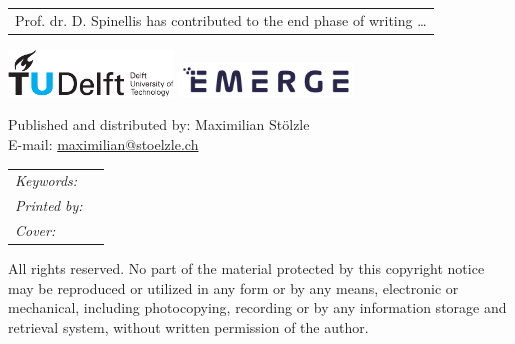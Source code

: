 \begin{titlepage}
\begin{tabular}{p{4.5cm}l}
    \multicolumn{2}{l}{Prof. dr. D. Spinellis has contributed to the end
    phase of writing \ldots} \\
\end{tabular}


\medskip
\medskip

\medskip
\vfill
\begin{center}
    \includegraphics[height=0.5in]{title/logos/tudelft}
    \hspace{2em}
    \includegraphics[height=0.35in]{title/logos/emerge}
\end{center}
\vfill

\noindent Published and distributed by: Maximilian Stölzle\\
E-mail: \href{mailto:maximilian@stoelzle.ch}{maximilian@stoelzle.ch}\\

\noindent
\begin{tabular}{@{}p{}@{}p{}}
  \textit{Keywords:} &  \\[\medskipamount]
      \textit{Printed by:} &  \\[\medskipamount]
      \textit{Cover:} &  \\[\medskipamount]
\end{tabular}

\medskip
\medskip
\noindent All rights reserved. No part of the material protected by this copyright notice may be
reproduced or utilized in any form or by any means, electronic or mechanical, including
photocopying, recording or by any information storage and retrieval system, without
written permission of the author.


\end{titlepage}
